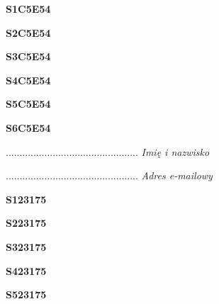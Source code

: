 \begin{turn}{90}\huge \textbf{S1C5E54}\end{turn}

\begin{turn}{90}\huge \textbf{S2C5E54}\end{turn}

\begin{turn}{90}\huge \textbf{S3C5E54}\end{turn}

\begin{turn}{90}\huge \textbf{S4C5E54}\end{turn}

\begin{turn}{90}\huge \textbf{S5C5E54}\end{turn}

\begin{turn}{90}\huge \textbf{S6C5E54}\end{turn}

\begin{turn}{90}\begin{minipage}{\linewidth} \vspace{20mm} ................................................  \textit{Imię i nazwisko}\end{minipage}\end{turn}

\begin{turn}{90}\begin{minipage}{\linewidth} \vspace{20mm} ................................................  \textit{Adres e-mailowy}\end{minipage}\end{turn}

\begin{turn}{90}\huge \textbf{S123175}\end{turn}

\begin{turn}{90}\huge \textbf{S223175}\end{turn}

\begin{turn}{90}\huge \textbf{S323175}\end{turn}

\begin{turn}{90}\huge \textbf{S423175}\end{turn}

\begin{turn}{90}\huge \textbf{S523175}\end{turn}

